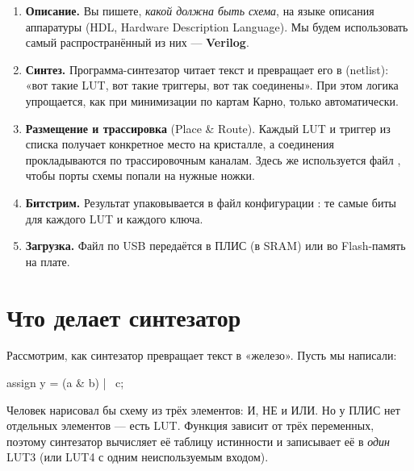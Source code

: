 \begin{enumerate}
  \item \textbf{Описание.} Вы пишете, \emph{какой должна быть схема}, на языке
        описания аппаратуры (HDL, Hardware Description Language). Мы будем
        использовать самый распространённый из них --- \textbf{Verilog}.
  \item \textbf{Синтез.} Программа-синтезатор читает текст и превращает его в
         (netlist): «вот такие LUT, вот такие триггеры,
        вот так соединены». При этом логика упрощается, как при минимизации
        по картам Карно, только автоматически.
  \item \textbf{Размещение и трассировка} (Place \& Route). Каждый LUT и
        триггер из списка получает конкретное место на кристалле, а соединения
        прокладываются по трассировочным каналам. Здесь же используется файл
        , чтобы порты схемы попали на нужные ножки.
  \item \textbf{Битстрим.} Результат упаковывается в файл конфигурации
        : те самые биты для каждого LUT и каждого ключа.
  \item \textbf{Загрузка.} Файл по USB передаётся в ПЛИС (в SRAM) или во
        Flash-память на плате.
\end{enumerate}

\section{Что делает синтезатор}

Рассмотрим, как синтезатор превращает текст в «железо». Пусть мы написали:
\begin{vcode}
assign y = (a & b) | ~c;
\end{vcode}

Человек нарисовал бы схему из трёх элементов: И, НЕ и ИЛИ. Но у ПЛИС нет
отдельных элементов --- есть LUT. Функция зависит от трёх переменных,
поэтому синтезатор вычисляет её таблицу истинности и записывает её в
\emph{один} LUT3 (или LUT4 с одним неиспользуемым входом).

